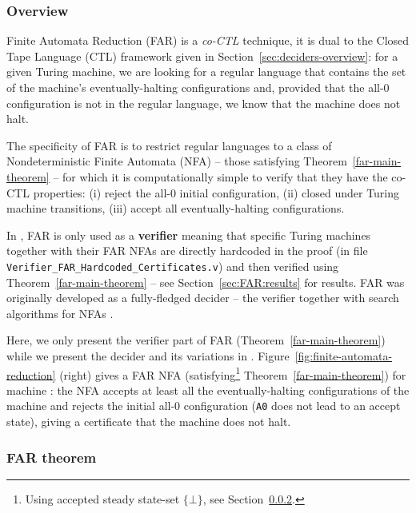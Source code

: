 \vspace{-1em}
\subsubsection{Overview}

\newcommand{\M}{M}
\newcommand{\T}{^{T}}

Finite Automata Reduction (FAR) is a \textit{co-CTL} technique, \ie it is dual to the Closed Tape Language (CTL) framework given in Section~\ref{sec:deciders-overview}: for a given Turing machine, we are looking for a regular language that contains the set of the machine's eventually-halting configurations and, provided that the all-0 configuration is not in the regular language, we know that the machine does not halt.

The specificity of FAR is to restrict regular languages to a class of Nondeterministic Finite Automata (NFA) -- those satisfying Theorem~\ref{far-main-theorem} -- for which it is computationally simple to verify that they have the co-CTL properties: (i) reject the all-0 initial configuration, (ii) closed under Turing machine transitions, (iii) accept all eventually-halting configurations.

In \CoqBB, FAR is only used as a \textbf{verifier} meaning that specific Turing machines together with their FAR NFAs are directly hardcoded in the proof (in file \texttt{Verifier\_FAR\_Hardcoded\_Certificates.v}) and then verified using Theorem~\ref{far-main-theorem} -- see Section~\ref{sec:FAR:results} for results. FAR was originally developed as a fully-fledged decider -- \ie the verifier together with search algorithms for NFAs \cite{FAR,bbchallenge_part1}.

Here, we only present the verifier part of FAR (Theorem~\ref{far-main-theorem}) while we present the decider and its variations in \cite{bbchallenge_part1}. Figure~\ref{fig:finite-automata-reduction} (right) gives a FAR NFA (\ie satisfying\footnote{Using accepted steady state-set $\{\bot\}$, see Section~\ref{sec:FAR:theorem}.} Theorem~\ref{far-main-theorem}) for machine : the NFA accepts at least all the eventually-halting configurations of the machine and rejects the initial all-0 configuration (\ie \texttt{A0} does not lead to an accept state), giving a certificate that the machine does not halt.

\subsubsection{FAR theorem}\label{sec:FAR:theorem}

